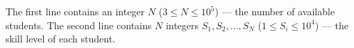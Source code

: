 The first line contains an integer $N$ ($3 \le N \le 10^5$) --- the number of available students.
The second line contains $N$ integers $S_1, S_2, \dots, S_N$ ($1 \le S_i \le 10^4$) --- the skill level of each student.